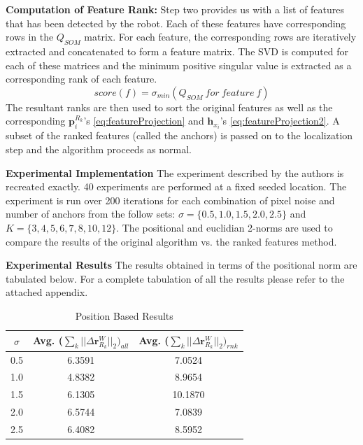 \documentclass[10pt,twocolumn,letterpaper]{article}
\begin{document}
\textbf{Computation of Feature Rank:} Step two provides us with a list of features that has been detected by the robot. Each of these features have corresponding rows in the $Q_{SOM}$ matrix. For each feature, the corresponding rows are iteratively extracted and concatenated to form a feature matrix. The SVD is computed for each of these matrices and the minimum positive singular value is extracted as a corresponding rank of each feature. 
\begin{equation} \label{eq:Qjjj}
score(f) = \sigma_{min}(Q_{SOM} \ for \ feature \ f)
\end{equation}
The resultant ranks are then used to sort the original features as well as the corresponding 
$\boldsymbol{p}_{i}^{R_k}$'s \eqref{eq:featureProjection} and $\boldsymbol{h}_{x_i}$'s 
\eqref{eq:featureProjection2}. A subset of the ranked features (called the anchors) is passed 
on to the localization step and the algorithm proceeds as normal.

\textbf{ Experimental Implementation } 
The experiment described by the authors is recreated exactly. 40 experiments are performed at a fixed seeded location. The experiment is run over 200 iterations for each combination of pixel noise and number of anchors from the follow sets: $\sigma=\{0.5, 1.0, 1.5, 2.0, 2.5\} $ and $ K = \{ 3, 4, 5, 6, 7, 8, 10, 12 \}$. The positional and euclidian 2-norms are used to compare the results of the original algorithm vs. the ranked features method.

\textbf{ Experimental Results }
The results obtained in terms of the positional norm are tabulated below. For a complete tabulation of all the results please refer to the attached appendix. 

\begin{table}[h]
\begin{center}
\begin{tabular}{|c|c|c|}
\hline
$\sigma$ & Avg. ($ \sum_k || \Delta \boldsymbol{r}_{R_k}^W ||_2)_{all} $ & Avg. ($ \sum_k || \Delta \boldsymbol{r}_{R_k}^W ||_2)_{rnk} $  \\
\hline
0.5  & 6.3591  &  7.0524 \\
\hline
1.0  &  4.8382 &  8.9654 \\
\hline
1.5  &  6.1305 &  10.1870 \\
\hline
2.0  &  6.5744 &  7.0839 \\
\hline
2.5  &  6.4082 &  8.5952 \\
\hline
\end{tabular}
\end{center}
\caption{Position Based Results}
\end{table}
\end{document}
